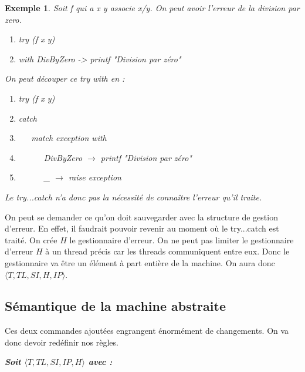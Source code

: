 \documentclass[10pt,a4paper]{report}
\newtheorem{ex}{Exemple}
\begin{document}
	\begin{ex}
		Soit f qui a x y associe x/y. On peut avoir l'erreur de la division par zero.
		\smallbreak
		\begin{enumerate}
			\item try (f x y)
			\item with DivByZero -> printf "Division par zéro"
		\end{enumerate}
		\medbreak
		
		
		On peut découper ce try with en :
		\smallbreak
		\begin{enumerate}
			\item try (f x y)
			\item catch
			\item ~~~match exception with 
			\item ~~~~~~DivByZero $\rightarrow$ printf "Division par zéro"
			\item ~~~~~~\_ $\rightarrow$ raise exception
		\end{enumerate}
		\medbreak
		
		Le try...catch n'a donc pas la nécessité de connaître l'erreur qu'il traite.
	\end{ex}
	
	\medbreak
	
	On peut se demander ce qu'on doit sauvegarder avec la structure de gestion d'erreur. En effet, il faudrait pouvoir revenir au moment où le try...catch est traité. On crée $H$ le gestionnaire d'erreur. On ne peut pas limiter le gestionnaire d'erreur $H$ à un thread précis car les threads communiquent entre eux. Donc le gestionnaire va être un élément à part entière de la machine. On aura donc $\langle T,TL,SI,H,IP\rangle$.
	\newpage
	
	
	
	\subsection{Sémantique de la machine abstraite}
	
	Ces deux commandes ajoutées engrangent énormément de changements. On va donc devoir redéfinir nos règles. 
	\bigbreak
	
	\textbf{\textit{Soit $\langle T,TL,SI,IP,H\rangle$ avec :}}
	
\end{document}
